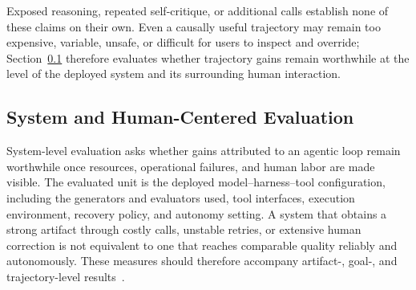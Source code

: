 Exposed reasoning, repeated self-critique, or additional calls establish none of these claims on their own. Even a causally useful trajectory may remain too expensive, variable, unsafe, or difficult for users to inspect and override; Section~\ref{subsec:system-human-eval} therefore evaluates whether trajectory gains remain worthwhile at the level of the deployed system and its surrounding human interaction.

\subsection{System and Human-Centered Evaluation}
\label{subsec:system-human-eval}

System-level evaluation asks whether gains attributed to an agentic loop remain worthwhile once resources, operational failures, and human labor are made visible. The evaluated unit is the deployed model--harness--tool configuration, including the generators and evaluators used, tool interfaces, execution environment, recovery policy, and autonomy setting. A system that obtains a strong artifact through costly calls, unstable retries, or extensive human correction is not equivalent to one that reaches comparable quality reliably and autonomously. These measures should therefore accompany artifact-, goal-, and trajectory-level results~\cite{avg250915160,avg260605525,avg260526144,avg260608091}.

